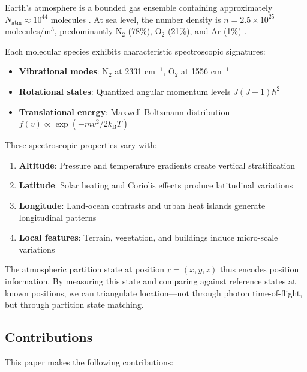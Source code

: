 \documentclass[twocolumn,10pt,a4paper]{article}
\theoremstyle{definition}
\theoremstyle{remark}
\newcommand{\kB}{k_{\mathrm{B}}}
\begin{document}
Earth's atmosphere is a bounded gas ensemble containing approximately $N_{\text{atm}} \approx 10^{44}$ molecules \cite{trenberth2005mass}. At sea level, the number density is $n = 2.5 \times 10^{25}$ molecules/m$^3$, predominantly N$_2$ (78\%), O$_2$ (21\%), and Ar (1\%) \cite{wallace2006atmospheric}.

Each molecular species exhibits characteristic spectroscopic signatures:
\begin{itemize}
    \item \textbf{Vibrational modes}: N$_2$ at 2331 cm$^{-1}$, O$_2$ at 1556 cm$^{-1}$
    \item \textbf{Rotational states}: Quantized angular momentum levels $J(J+1)\hbar^2$
    \item \textbf{Translational energy}: Maxwell-Boltzmann distribution $f(v) \propto \exp(-mv^2/2\kB T)$
\end{itemize}

These spectroscopic properties vary with:
\begin{enumerate}
    \item \textbf{Altitude}: Pressure and temperature gradients create vertical stratification
    \item \textbf{Latitude}: Solar heating and Coriolis effects produce latitudinal variations
    \item \textbf{Longitude}: Land-ocean contrasts and urban heat islands generate longitudinal patterns
    \item \textbf{Local features}: Terrain, vegetation, and buildings induce micro-scale variations
\end{enumerate}

The atmospheric partition state at position $\mathbf{r} = (x, y, z)$ thus encodes position information. By measuring this state and comparing against reference states at known positions, we can triangulate location—not through photon time-of-flight, but through partition state matching.

\subsection{Contributions}

This paper makes the following contributions:
\end{document}
